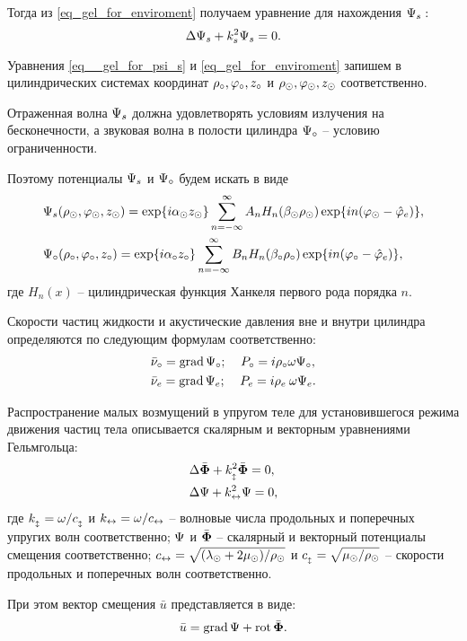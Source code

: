 Тогда из \eqref{eq_gel_for_enviroment} получаем уравнение для нахождения $\P_s:$
\begin{equation}\label{eq__gel_for_psi_s}
\Lap\P_s+k_s^2\P_s=0.
\end{equation}

Уравнения \eqref{eq__gel_for_psi_s} и \eqref{eq_gel_for_enviroment} запишем в цилиндрических системах координат $\r\c, \f\c, z\c$ и $\r\cyl, \f\cyl, z\cyl$ соответственно. 

Отраженная волна $\P_s$ должна удовлетворять условиям излучения на бесконечности, а звуковая волна в полости цилиндра $\P\c$ -- условию ограниченности.

Поэтому потенциалы $\P_s$ и $\P\c$ будем искать в виде
\begin{align}
&\P_s(\r\cyl, \f\cyl, z\cyl)= \exp\{i\alpha\cyl z\cyl\}\sum_{n=-\infty}^{\infty}A_nH_n(\beta\cyl \r\cyl)\exp\{in(\f\cyl-\hat\f\en)\},\label{razloj_psi_s}\\
&\P\c(\r\c, \f\c, z\c)= \exp\{i\alpha\c z\c\}\sum_{n=-\infty}^{\infty}B_nH_n(\beta\c \r\c)\exp\{in(\f\c-\hat\f\en)\},\label{razloj_psi_o}
\end{align}
где $H_n(x)$ -- цилиндрическая функция Ханкеля первого рода порядка $n.$

Скорости частиц жидкости и акустические давления вне и внутри цилиндра определяются по следующим формулам соответственно:
\begin{align*}
&\bar{\nu}\c=\grad\P\c;\:\:\:\:\:P\c=i\r\c\omega\P\c,\\
&\bar{\nu}\en=\grad\P\en;\:\:\:\:\:P\en=i\r\en\:\omega\P\en.
\end{align*}

Распространение малых возмущений в упругом теле для установившегося режима движения частиц тела описывается скалярным и векторным уравнениями Гельмгольца:
\begin{align}
&\Lap\bar{\F}+k_{\popr}^2\bar{\F}=0,\\
&\Lap\P+k\prodol^2\P=0,\label{fi_gel}
\end{align}
где $k_{\popr}=\omega/c_{\popr}$ и $k\prodol=\omega/c\prodol$ -- волновые числа продольных и поперечных упругих волн соответственно; $\P$ и $\bar\F$ -- скалярный и векторный потенциалы смещения соответственно; $c\prodol=\sqrt{(\lambda\cyl+2\mu\cyl)/\r\cyl}$ и $c_{\popr}=\sqrt{\mu\cyl/\r\cyl}$ -- скорости продольных и поперечных волн соответственно.

При этом вектор смещения $\bar{u}$ представляется в виде:
\begin{equation}
\bar{u}=\grad\P+\rot\bar{\F}.
\end{equation}

